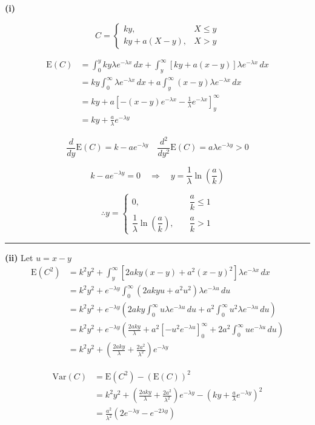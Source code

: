 \documentclass[12pt]{article}
\begin{document}
\newcommand{\ds}{\displaystyle}

\textbf{(i)}

$$
C=
\begin{cases}
ky, & X\leq y\\
ky+a(X-y), & X>y
\end{cases}
$$

\begin{align*}
\mathrm{E}(C)
&=\int_0^y ky\lambda e^{-\lambda x}\,dx
+\int_y^\infty\left[ky+a(x-y)\right]\lambda e^{-\lambda x}\,dx\\
&=ky\int_0^\infty\lambda e^{-\lambda x}\,dx
+a\int_y^\infty(x-y)\lambda e^{-\lambda x}\,dx\\
&=ky+a\left[-(x-y)e^{-\lambda x}-\frac1\lambda e^{-\lambda x}\right]_y^\infty\\
&=ky+\frac{a}{\lambda}e^{-\lambda y}
\end{align*}

$$\frac{d}{dy}\mathrm{E}(C)=k-ae^{-\lambda y} \quad \frac{d^2}{dy^2}\mathrm{E}(C)=a\lambda e^{-\lambda y}>0$$


$$k-ae^{-\lambda y}=0
\quad\Longrightarrow\quad
y=\frac{1}{\lambda}\ln\left(\frac{a}{k}\right)$$


$$
\boxed{
\therefore y=
\begin{cases}
0, & \quad\dfrac{a}{k}\leq1\\[6pt]
\dfrac{1}{\lambda}\ln\left(\dfrac{a}{k}\right),
& \quad \dfrac{a}{k}>1
\end{cases}
}
$$

\bigskip\hrule\bigskip

\textbf{(ii)} Let $u=x-y$
\begin{align*}
\mathrm{E}(C^2)
&=k^2y^2+
\int_y^\infty
\left[2aky(x-y)+a^2(x-y)^2\right]
\lambda e^{-\lambda x}\,dx\\
&=k^2y^2+e^{-\lambda y}
\int_0^\infty
\left(2akyu+a^2u^2\right)
\lambda e^{-\lambda u}\,du\\
&=k^2y^2+e^{-\lambda y}
\left(
2aky\int_0^\infty u\lambda e^{-\lambda u}\,du
+a^2\int_0^\infty u^2\lambda e^{-\lambda u}\,du
\right)\\
&=k^2y^2+e^{-\lambda y}
\left(
\frac{2aky}{\lambda}
+a^2\left[-u^2e^{-\lambda u}\right]_0^\infty
+2a^2\int_0^\infty ue^{-\lambda u}\,du
\right)\\
&=k^2y^2+\left(\frac{2aky}{\lambda}+\frac{2a^2}{\lambda^2}\right)e^{-\lambda y}
\end{align*}

\begin{align*}
\mathrm{Var}(C)
&=\mathrm{E}(C^2)-\left(\mathrm{E}(C)\right)^2\\
&=k^2y^2+\left(\frac{2aky}{\lambda}+\frac{2a^2}{\lambda^2}\right)e^{-\lambda y}
-\left(ky+\frac{a}{\lambda}e^{-\lambda y}\right)^2\\
&=\boxed{\frac{a^2}{\lambda^2}
\left(2e^{-\lambda y}-e^{-2\lambda y}\right)}
\end{align*}
\end{document}
